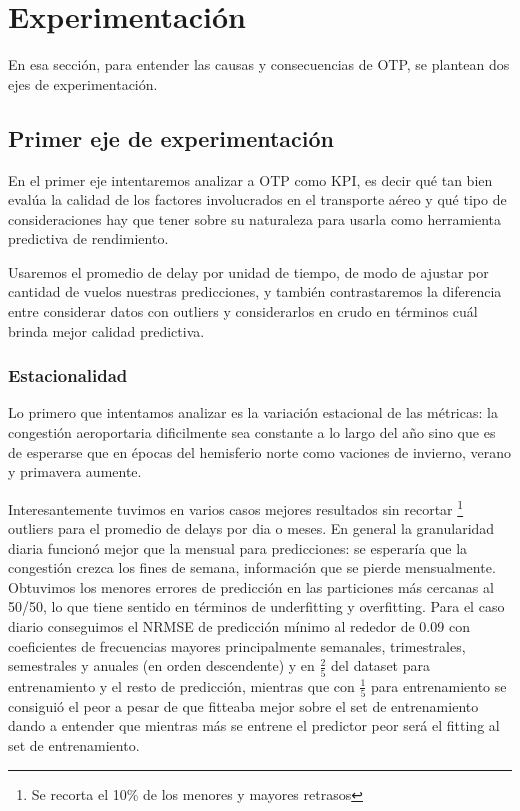 \section{Experimentación}
En esa sección, para entender las causas y consecuencias de OTP, se plantean dos ejes de experimentación.
\subsection{Primer eje de experimentación}
En el primer eje intentaremos analizar a OTP como KPI, es decir qué tan bien evalúa la calidad de los factores involucrados en el transporte aéreo y qué tipo de consideraciones hay que tener sobre su naturaleza para usarla como herramienta predictiva de rendimiento.

Usaremos el promedio de delay por unidad de tiempo, de modo de ajustar por cantidad de vuelos nuestras predicciones, y también contrastaremos la diferencia entre considerar datos con outliers y considerarlos en crudo en términos cuál brinda mejor calidad predictiva.

\subsubsection{Estacionalidad}
Lo primero que intentamos analizar es la variación estacional de las métricas: la congestión aeroportaria dificilmente sea constante a lo largo del año sino que es de esperarse que en épocas del hemisferio norte como vaciones de invierno, verano y primavera aumente.

Interesantemente tuvimos en varios casos mejores resultados sin recortar \footnote{Se recorta el 10\% de los menores y mayores retrasos} outliers para el promedio de delays por dia o meses. En general la granularidad diaria funcionó mejor que la mensual para predicciones: se esperaría que la congestión crezca los fines de semana, información que se pierde mensualmente. Obtuvimos los menores errores de predicción en las particiones más cercanas al 50/50, lo que tiene sentido en términos de underfitting y overfitting. Para el caso diario conseguimos el NRMSE de predicción mínimo al rededor de 0.09 con coeficientes de frecuencias mayores principalmente semanales, trimestrales, semestrales y anuales (en orden descendente) y en $\frac{2}{5}$ del dataset para entrenamiento y el resto de predicción, mientras que con $\frac{1}{5}$ para entrenamiento se consiguió el peor a pesar de que fitteaba mejor sobre el set de entrenamiento dando a entender que mientras más se entrene el predictor peor será el fitting al set de entrenamiento.

